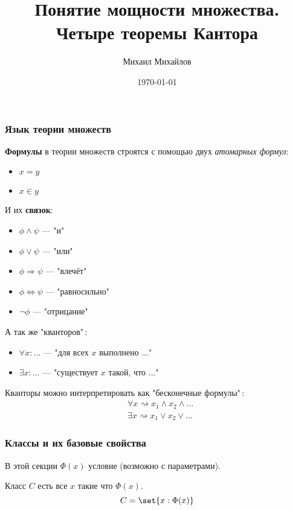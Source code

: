 \documentclass{article}
\title{Понятие мощности множества. Четыре теоремы Кантора}
\author{Михаил Михайлов}
\date{\today}
\newcommand{\class}[1]{\set{#1}}
\begin{document}
\maketitle
\tableofcontents


\subsubsection{Язык теории множеств}
\textbf{Формулы} в теории множеств строятся с помощью двух \textit{атомарных формул}:
\begin{itemize}
    \item \(x = y\)
    \item \(x \in y\)
\end{itemize}

И их \textbf{связок}:
\begin{itemize}
    \item \(\phi \land \psi\) --- "и"\,
    \item \(\phi \lor \psi\) --- "или"\,
    \item \(\phi \Rightarrow \psi\) --- "влечёт"\,
    \item \(\phi \Leftrightarrow \psi\) --- "равносильно"\,
    \item \(\neg\phi\) --- "отрицание"\,
\end{itemize}

А так же "кванторов"\,:
\begin{itemize}
    \item \(\forall x: \ldots\) — "для всех $x$ выполнено ..."
    \item \(\exists x: \ldots\) --- "существует $x$ такой, что ..."\,
\end{itemize}

\begin{remark}
    \label{rem:quantifier-relations-basic-operations}
    Кванторы можно интерпретировать как "бесконечные формулы"\,:
    \begin{align*}
        &\forall x \rightsquigarrow x_1 \land x_2 \land \ldots \\
        &\exists x \rightsquigarrow x_1 \lor  x_2 \lor  \ldots
    \end{align*}
\end{remark}

\subsubsection{Классы и их базовые свойства}
В этой секции \(\Phi(x)\) условие (возможно с параметрами). 
\begin{definition}
    \label{def:class}
    Класс \(C\) есть все  \(x\) такие что \(\Phi(x)\).
    \[C = \class{x : \Phi(x)}\]
\end{definition} 
\end{document}
